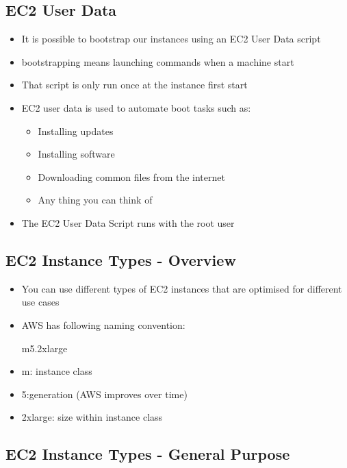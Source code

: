 \subsection{EC2 User Data}


\begin{itemize}
	\item It is possible to bootstrap our instances using an EC2 User Data script
	\item bootstrapping means launching commands when a machine start
	\item That script is only run once at the instance first start 
	\item EC2 user data is used to automate boot tasks such as: 
	\begin{itemize}
		\item Installing updates
		\item Installing software
		\item Downloading common files from the internet
		\item Any thing you can think of
	\end{itemize}
	\item The EC2 User Data Script runs with the root user
\end{itemize}


\subsection{EC2 Instance Types - Overview}

\begin{itemize}
	\item You can use different types of EC2 instances that are optimised  for different use cases
	\item AWS has following naming convention:
	\begin{center}
		m5.2xlarge
	\end{center} 
	\item m: instance class
	\item 5:generation (AWS improves over time)
	\item 2xlarge: size within instance class
\end{itemize}


\subsection{EC2 Instance Types - General Purpose}

